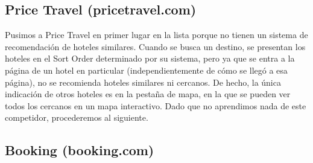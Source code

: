 \documentclass[12pt]{report}
\begin{document}
\subsection*{Price Travel (pricetravel.com)}

Pusimos a Price Travel en primer lugar en la lista porque no tienen un sistema de recomendación de hoteles similares. Cuando se busca un destino, se presentan los hoteles en el Sort Order determinado por su sistema, pero ya que se entra a la página de un hotel en particular (independientemente de cómo se llegó a esa página), no se recomienda hoteles similares ni cercanos. De hecho, la única indicación de otros hoteles es en la pestaña de mapa, en la que se pueden ver todos los cercanos en un mapa interactivo. Dado que no aprendimos nada de este competidor, procederemos al siguiente.

\subsection*{Booking (booking.com)}
\end{document}
